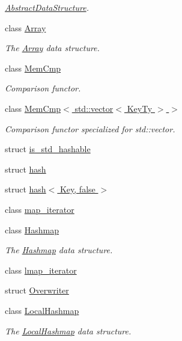 \begin{DoxyCompactItemize}
\begin{DoxyCompactList}\small\item\em \hyperlink{classshad_1_1AbstractDataStructure}{Abstract\-Data\-Structure}. \end{DoxyCompactList}\item 
class \hyperlink{classshad_1_1Array}{Array}
\begin{DoxyCompactList}\small\item\em The \hyperlink{classshad_1_1Array}{Array} data structure. \end{DoxyCompactList}\item 
class \hyperlink{classshad_1_1MemCmp}{Mem\-Cmp}
\begin{DoxyCompactList}\small\item\em Comparison functor. \end{DoxyCompactList}\item 
class \hyperlink{classshad_1_1MemCmp_3_01std_1_1vector_3_01KeyTy_01_4_01_4}{Mem\-Cmp$<$ std\-::vector$<$ Key\-Ty $>$ $>$}
\begin{DoxyCompactList}\small\item\em Comparison functor specialized for std\-::vector. \end{DoxyCompactList}\item 
struct \hyperlink{structshad_1_1is__std__hashable}{is\-\_\-std\-\_\-hashable}
\item 
struct \hyperlink{structshad_1_1hash}{hash}
\item 
struct \hyperlink{structshad_1_1hash_3_01Key_00_01false_01_4}{hash$<$ Key, false $>$}
\item 
class \hyperlink{classshad_1_1map__iterator}{map\-\_\-iterator}
\item 
class \hyperlink{classshad_1_1Hashmap}{Hashmap}
\begin{DoxyCompactList}\small\item\em The \hyperlink{classshad_1_1Hashmap}{Hashmap} data structure. \end{DoxyCompactList}\item 
class \hyperlink{classshad_1_1lmap__iterator}{lmap\-\_\-iterator}
\item 
struct \hyperlink{structshad_1_1Overwriter}{Overwriter}
\item 
class \hyperlink{classshad_1_1LocalHashmap}{Local\-Hashmap}
\begin{DoxyCompactList}\small\item\em The \hyperlink{classshad_1_1LocalHashmap}{Local\-Hashmap} data structure. \end{DoxyCompactList}\item 

\end{DoxyCompactItemize}
